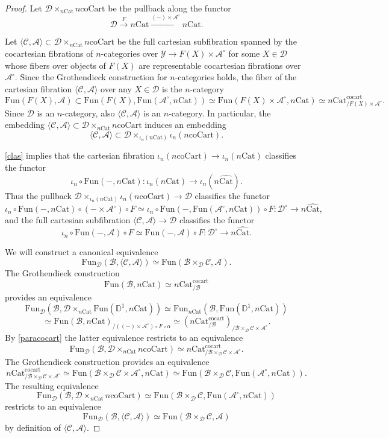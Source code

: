 \documentclass[10pt,oneside]{article}
\numberwithin{equation}{section} %
\numberwithin{figure}{section} %
\theoremstyle{plain}
\theoremstyle{definition}
\newcommand{\bD}{{\mathbb D}}
\newcommand{\mA}{{\mathcal A}}
\newcommand{\mB}{{\mathcal B}}
\newcommand{\mC}{{\mathcal C}}
\newcommand{\mD}{{\mathcal D}}
\newcommand{\mY}{{\mathcal Y}}
\newcommand{\Cat}{\mathrm{Cat}}
\newcommand{\Fun}{\mathrm{Fun}}
\newcommand{\cocart}{{\mathrm{cocart}}}
\newcommand{\coCart}{{\mathrm{coCart}}}
\begin{document}
\begin{proof}

Let $ \mD \times_{n\Cat} n\coCart$ be the pullback along the functor $$\mD \xrightarrow{F} n \Cat \xrightarrow{(-)\times \mA^\circ} n \Cat.$$ 

Let $ \langle \mC, \mA \rangle \subset \mD \times_{n\Cat} n\coCart$ be the full cartesian subfibration spanned by the cocartesian fibrations of $n$-categories over $\mY \to F(X) \times \mA^\circ $ for some $X \in \mD$ 
whose fibers over objects of $F(X)$ are representable cocartesian fibrations over $\mA^\circ.$
Since the Grothendieck construction for $n$-categories holds,
the fiber of the cartesian fibration $\langle \mC, \mA \rangle$ over any $X \in \mD$ is the $n$-category $$\Fun(F(X),\mA) \subset \Fun(F(X),\Fun(\mA^\circ, n\Cat)) \simeq \Fun(F(X) \times \mA^\circ, n\Cat) \simeq n \Cat^{\cocart}_{/ F(X) \times \mA^\circ}. $$
Since $\mD$ is an $n$-category, also $ \langle \mC, \mA \rangle $ is an $n$-category.
In particular, the embedding $\langle \mC, \mA \rangle \subset \mD \times_{n\Cat} n\coCart$ induces an embedding 
$$\langle \mC, \mA \rangle \subset \mD \times_{\iota_n(n\Cat)} \iota_n(n\coCart).$$

\cref{clas} implies that the cartesian fibration $ \iota_n(n\coCart) \to \iota_n(n\Cat)$
classifies the functor $$\iota_n \circ \Fun(-,n\Cat) : \iota_n(n\Cat) \to \iota_n(n \widehat{\Cat}).$$
Thus the pullback $\mD \times_{\iota_n(n\Cat)} \iota_n(n\coCart) \to \mD$
classifies the functor $$\iota_n \circ \Fun(-,n\Cat) \circ (-\times \mA^\circ) \circ F \simeq \iota_n \circ \Fun(-,\Fun(\mA^\circ,n\Cat)) \circ F: \mD^\circ \to n \widehat{\Cat},$$
and the full cartesian subfibration $\langle \mC, \mA \rangle \to \mD$ classifies the functor $$\iota_n \circ \Fun(-,\mA) \circ F \simeq \Fun(-,\mA) \circ F: \mD^\circ \to n\widehat{\Cat}.$$

We will construct a canonical equivalence
$$ \Fun_\mD(\mB, \langle \mC, \mA \rangle) \simeq \Fun(\mB\times_\mD \mC, \mA).$$
The Grothendieck construction $$\Fun(\mB,n\Cat) \simeq n\Cat^\cocart_{/\mB}$$ provides an equivalence
$$ \Fun_\mD(\mB, \mD \times_{n\Cat}\Fun(\bD^1,n\Cat)) \simeq \Fun_{n\Cat}(\mB, \Fun(\bD^1,n\Cat)) $$$$ \simeq \Fun(\mB,n\Cat)_{/((-)\times \mA^\circ) \circ F \circ \alpha} \simeq (n\Cat^\cocart_{/\mB})_{/ \mB\times_\mD \mC \times \mA^\circ}.$$
By \cref{paracocart} the latter equivalence restricts to an equivalence
$$ \Fun_\mD(\mB, \mD \times_{n\Cat} n\coCart) \simeq n\Cat^\cocart_{/ \mB\times_\mD \mC \times \mA^\circ}.$$
The Grothendieck construction provides an equivalence
$$n\Cat^\cocart_{/ \mB\times_\mD \mC \times \mA^\circ}\simeq 
\Fun(\mB\times_\mD \mC \times \mA^\circ,n\Cat)
 \simeq \Fun(\mB\times_\mD \mC, \Fun(\mA^\circ,n\Cat)).$$
The resulting equivalence 
$$ \Fun_\mD(\mB, \mD \times_{n\Cat} n\coCart) \simeq \Fun(\mB\times_\mD \mC, \Fun(\mA^\circ,n\Cat)) $$
restricts to an equivalence 
$$ \Fun_\mD(\mB, \langle \mC, \mA \rangle) \simeq \Fun(\mB\times_\mD \mC, \mA)$$
by definition of $\langle \mC, \mA \rangle$.
\end{proof}
\end{document}
